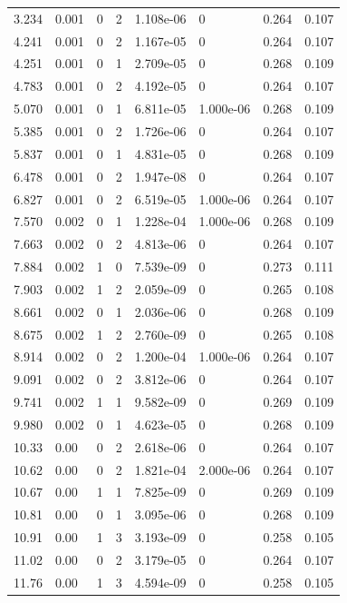 \documentclass[preview]{standalone}
\begin{document}
{{\begin{tabular}{L{1.2cm}C{1.2cm} C{0.3cm}C{0.5cm} C{1.4cm}C{1.4cm} C{1.4cm}C{1.4cm}}
  3.234  &  0.001  & 0     &  2 &  1.108e-06  & 0  & 0.264 &  0.107   \\ 
  4.241  &  0.001  & 0     &  2 &  1.167e-05  & 0  & 0.264 &  0.107   \\ 
  4.251  &  0.001  & 0     &  1 &  2.709e-05  & 0  & 0.268 &  0.109   \\ 
  4.783  &  0.001  & 0     &  2 &  4.192e-05  & 0  & 0.264 &  0.107   \\ 
  5.070  &  0.001  & 0     &  1 &  6.811e-05  & 1.000e-06  & 0.268 &  0.109   \\ 
  5.385  &  0.001  & 0     &  2 &  1.726e-06  & 0  & 0.264 &  0.107   \\ 
  5.837  &  0.001  & 0     &  1 &  4.831e-05  & 0  & 0.268 &  0.109   \\ 
  6.478  &  0.001  & 0     &  2 &  1.947e-08  & 0  & 0.264 &  0.107   \\ 
  6.827  &  0.001  & 0     &  2 &  6.519e-05  & 1.000e-06  & 0.264 &  0.107   \\ 
  7.570  &  0.002  & 0     &  1 &  1.228e-04  & 1.000e-06  & 0.268 &  0.109   \\ 
  7.663  &  0.002  & 0     &  2 &  4.813e-06  & 0  & 0.264 &  0.107   \\ 
  7.884  &  0.002  & 1     &  0 &  7.539e-09  & 0  & 0.273 &  0.111   \\ 
  7.903  &  0.002  & 1     &  2 &  2.059e-09  & 0  & 0.265 &  0.108   \\ 
  8.661  &  0.002  & 0     &  1 &  2.036e-06  & 0  & 0.268 &  0.109   \\ 
  8.675  &  0.002  & 1     &  2 &  2.760e-09  & 0  & 0.265 &  0.108   \\ 
  8.914  &  0.002  & 0     &  2 &  1.200e-04  & 1.000e-06  & 0.264 &  0.107   \\ 
  9.091  &  0.002  & 0     &  2 &  3.812e-06  & 0  & 0.264 &  0.107   \\ 
  9.741  &  0.002  & 1     &  1 &  9.582e-09  & 0  & 0.269 &  0.109   \\ 
  9.980  &  0.002  & 0     &  1 &  4.623e-05  & 0  & 0.268 &  0.109   \\ 
  10.33  &  0.00  & 0     &  2 &  2.618e-06  & 0  & 0.264 &  0.107   \\ 
  10.62  &  0.00  & 0     &  2 &  1.821e-04  & 2.000e-06  & 0.264 &  0.107   \\ 
  10.67  &  0.00  & 1     &  1 &  7.825e-09  & 0  & 0.269 &  0.109   \\ 
  10.81  &  0.00  & 0     &  1 &  3.095e-06  & 0  & 0.268 &  0.109   \\ 
  10.91  &  0.00  & 1     &  3 &  3.193e-09  & 0  & 0.258 &  0.105   \\ 
  11.02  &  0.00  & 0     &  2 &  3.179e-05  & 0  & 0.264 &  0.107   \\ 
  11.76  &  0.00  & 1     &  3 &  4.594e-09  & 0  & 0.258 &  0.105   \\ 
\hline 
\end{tabular} 

}}
\end{document}
